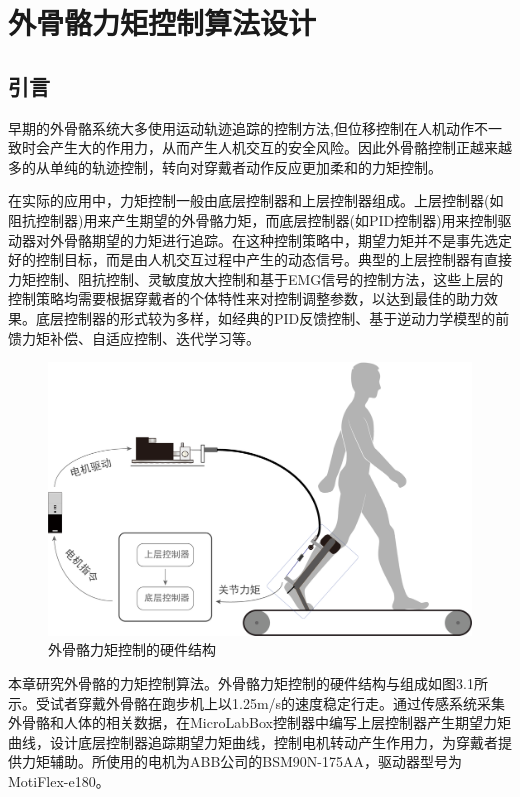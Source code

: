 \chapter{外骨骼力矩控制算法设计}
\section{引言}
早期的外骨骼系统大多使用运动轨迹追踪的控制方法,但位移控制在人机动作不一致时会产生大的作用力，从而产生人机交互的安全风险。因此外骨骼控制正越来越多的从单纯的轨迹控制，转向对穿戴者动作反应更加柔和的力矩控制。

在实际的应用中，力矩控制一般由底层控制器和上层控制器组成。上层控制器(如阻抗控制器)用来产生期望的外骨骼力矩，而底层控制器(如PID控制器)用来控制驱动器对外骨骼期望的力矩进行追踪。在这种控制策略中，期望力矩并不是事先选定好的控制目标，而是由人机交互过程中产生的动态信号。典型的上层控制器有直接力矩控制\cite{p32,p33}、阻抗控制\cite{p34}、灵敏度放大控制\cite{p35}和基于EMG信号的控制方法\cite{p36}，这些上层的控制策略均需要根据穿戴者的个体特性来对控制调整参数，以达到最佳的助力效果。底层控制器的形式较为多样，如经典的PID反馈控制\cite{p27,p28}、基于逆动力学模型的前馈力矩补偿\cite{p7,p22,p29}、自适应控制\cite{p30}、迭代学习\cite{p31}等。

\begin{figure}[!htb]
    \includegraphics[width=14cm]{fig/f48.png}
    \caption{外骨骼力矩控制的硬件结构}
    \label{fig:mark}
\end{figure}

本章研究外骨骼的力矩控制算法。外骨骼力矩控制的硬件结构与组成如图3.1所示。受试者穿戴外骨骼在跑步机上以1.25m/s的速度稳定行走。通过传感系统采集外骨骼和人体的相关数据，在MicroLabBox控制器中编写上层控制器产生期望力矩曲线，设计底层控制器追踪期望力矩曲线，控制电机转动产生作用力，为穿戴者提供力矩辅助。所使用的电机为ABB公司的BSM90N-175AA，驱动器型号为MotiFlex-e180。

